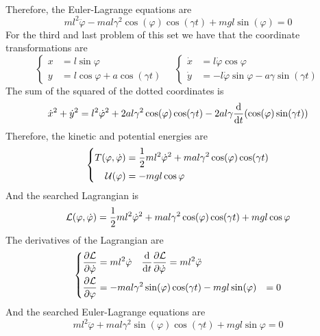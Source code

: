 \documentclass[../admech.tex]{subfiles}
\begin{document}
\begin{exe}
\begin{equation}
\begin{aligned}
		\end{aligned}
		\label{eq:lagdercp2}
	\end{equation}
	Therefore, the Euler-Lagrange equations are
	\begin{equation}
		ml^2\ddot{\varphi}-mal\gamma^2\cos(\varphi)\cos(\gamma t)+mgl\sin(\varphi)=0
		\label{eq:elcp2}
	\end{equation}
	For the third and last problem of this set we have that the coordinate transformations are
	\begin{equation}
		\left\{ \begin{aligned}
			x&=l\sin\varphi\\
			y&=l\cos\varphi+a\cos(\gamma t)
	\end{aligned}\right.\quad\left\{ \begin{aligned}
			\dot{x}&=l\dot{\varphi}\cos\varphi\\
			\dot{y}&=-l\dot{\varphi}\sin\varphi-a\gamma\sin(\gamma t)
	\end{aligned}\right.
		\label{eq:tcp3}
	\end{equation}
	The sum of the squared of the dotted coordinates is
	\begin{equation*}
		\dot{x}^2+\dot{y}^2=l^2\dot{\varphi}^2+2al\gamma^2\cos(\varphi)\cos(\gamma t)-2al\gamma\dv{t}(\cos(\varphi)\sin(\gamma t))
	\end{equation*}
	Therefore, the kinetic and potential energies are
	\begin{equation}
		\left\{ \begin{aligned}
				T(\varphi,\dot{\varphi})&=\frac{1}{2}ml^2\dot{\varphi}^2+mal\gamma^2\cos(\varphi)\cos(\gamma t)\\
				\mathcal{U}(\varphi)&=-mgl\cos\varphi
		\end{aligned}\right.
		\label{eq:potkincp3}
	\end{equation}
	And the searched Lagrangian is
	\begin{equation}
		\mathcal{L}(\varphi,\dot{\varphi})=\frac{1}{2}ml^2\dot{\varphi}^2+mal\gamma^2\cos(\varphi)\cos(\gamma t)+mgl\cos\varphi
		\label{eq:lagcp3}
	\end{equation}
	The derivatives of the Lagrangian are
	\begin{equation}
		\left\{ \begin{aligned}
				\pdv{\mathcal{L}}{\dot{\varphi}}&=ml^2\dot{\varphi}\quad\dv{t}\pdv{\mathcal{L}}{\dot{\varphi}}=ml^2\ddot{\varphi}\\
				\pdv{\mathcal{L}}{\varphi}&=-mal\gamma^2\sin(\varphi)\cos(\gamma t)-mgl\sin(\varphi)&=0
		\end{aligned}\right.
		\label{eq:lagdercp3}
	\end{equation}
	And the searched Euler-Lagrange equations are
	\begin{equation}
		ml^2\ddot{\varphi}+mal\gamma^2\sin(\varphi)\cos(\gamma t)+mgl\sin\varphi=0
		\label{eq:elcp3}
	\end{equation}
\end{exe}
\end{document}
